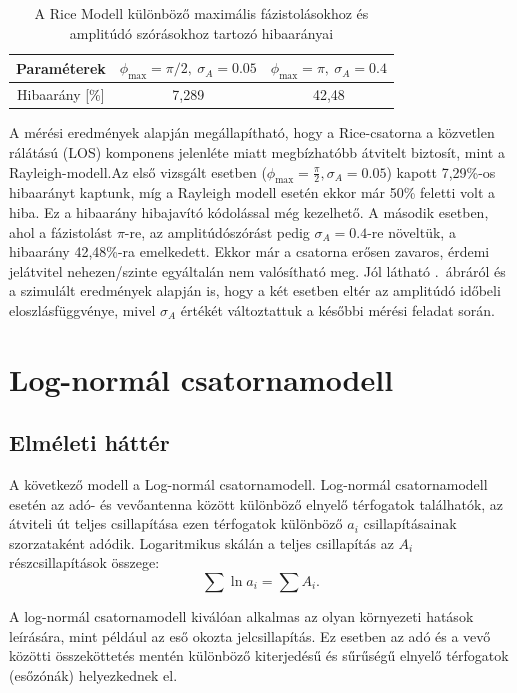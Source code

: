 \documentclass{article}
\begin{document}
\begin{table}[h]
    \centering
    \begin{tabular}{|c|c|c|}\hline
    Paraméterek & $\phi_\text{max}=\pi/2,\ \sigma_A=0.05$ & $\phi_\text{max}=\pi,\ \sigma_A=0.4$\\\hline
    Hibaarány [\%] & 7,289 & 42,48 \\\hline
    \end{tabular}
    \caption{A Rice Modell különböző maximális fázistolásokhoz és amplitúdó szórásokhoz tartozó
hibaarányai}
    \label{tab:ricErr}
\end{table}
A mérési eredmények alapján megállapítható, hogy a Rice-csatorna a közvetlen rálátású (LOS) komponens jelenléte miatt megbízhatóbb átvitelt biztosít, mint a  Rayleigh-modell.Az első vizsgált esetben ($\phi_{\text{max}}=\frac\pi2, \sigma_A=0.05$) kapott 7,29\%-os hibaarányt kaptunk, míg a Rayleigh modell esetén ekkor már 50\% feletti volt a hiba. Ez a hibaarány hibajavító kódolással még kezelhető. A második esetben, ahol a fázistolást $\pi$-re, az amplitúdószórást pedig $\sigma_A=0.4$-re növeltük, a hibaarány 42,48\%-ra emelkedett. Ekkor már a csatorna erősen zavaros, érdemi jelátvitel nehezen/szinte egyáltalán nem valósítható meg. Jól látható .~ábráról és a szimulált eredmények alapján is, hogy a két esetben eltér az amplitúdó időbeli eloszlásfüggvénye, mivel  $\sigma_A$ értékét változtattuk a későbbi mérési feladat során.
\section{Log-normál csatornamodell}
\subsection{Elméleti háttér}
A következő modell a Log-normál csatornamodell.
Log-normál csatornamodell esetén az adó- és vevőantenna között különböző elnyelő térfogatok találhatók, az átviteli út teljes csillapítása ezen térfogatok különböző $a_i$ csillapításainak szorzataként adódik. Logaritmikus skálán a teljes csillapítás az $A_i$ részcsillapítások összege: \[\sum \ln a_i=\sum A_i.\]

A log-normál csatornamodell kiválóan alkalmas az olyan környezeti hatások leírására, mint például az eső okozta jelcsillapítás. Ez esetben az adó és a vevő közötti összeköttetés mentén különböző kiterjedésű és sűrűségű elnyelő térfogatok (esőzónák) helyezkednek el.
\end{document}
